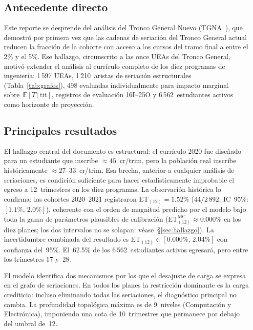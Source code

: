 \documentclass[11pt,letterpaper]{article}
\newcommand{\ET}[1]{\mathrm{ET}_{(#1)}}
\newcommand{\ETtit}{\mathbb{E}[T\,|\,\mathrm{tit}]}
\begin{document}
\subsection{Antecedente directo}

Este reporte se desprende del análisis del Tronco General Nuevo  (TGNA~\cite{TGNA2026}), que demostró por primera vez que las cadenas de seriación
del Tronco General actual reducen la fracción de la cohorte con acceso a los
cursos del tramo final a entre el 2\% y el 5\%.
Ese hallazgo, circunscrito a las once UEAs del Tronco General, motivó extender
el análisis al currículo completo de los diez programas de ingeniería:
1\,597 UEAs, 1\,210~aristas de seriación estructurales (Tabla~\ref{tab:grafos}),
498 evaluadas individualmente para impacto marginal sobre~$\ETtit$,
registros de evaluación 16I--25O y 6\,562~estudiantes activos como horizonte de proyección.

\subsection{Principales resultados}

El hallazgo central del documento es estructural: el currículo 2020 fue diseñado
para un estudiante que inscribe $\approx 45$~cr/trim, pero la población real
inscribe históricamente $\approx 27$--$33$~cr/trim.
Esa brecha, anterior a cualquier análisis de seriaciones, es condición suficiente
para hacer estadísticamente improbable el egreso a 12~trimestres en los diez
programas.
La observación histórica lo confirma: las cohortes 2020--2021 registraron
$\ET{12}=1.52\%$ ($44/2\,892$; IC~95\%: $[1.1\%,\,2.0\%]$), coherente con
el orden de magnitud predicho por el modelo bajo toda la gama de parámetros
plausibles de calibración ($\ET{12}^{\mathrm{MC}}\approx 0.000\%$ en los diez
planes; los dos intervalos no se solapan: véase~\S\ref{sec:hallazgo}).
La incertidumbre combinada del resultado es $\ET{12}\in[0.000\%,\,2.04\%]$ con
confianza del~95\%.
El~62.5\% de los 6\,562~estudiantes activos egresará, pero entre los trimestres
17 y~28.

El modelo identifica dos mecanismos por los que el desajuste de carga se expresa
en el grafo de seriaciones.
En todos los planes la restricción dominante es la carga crediticia: incluso
eliminando todas las seriaciones, el diagnóstico principal no cambia.
La profundidad topológica máxima es de 9~niveles (Computación y Electrónica),
imponiendo una cota de 10~trimestres que permanece por debajo del umbral de~12.
\end{document}
